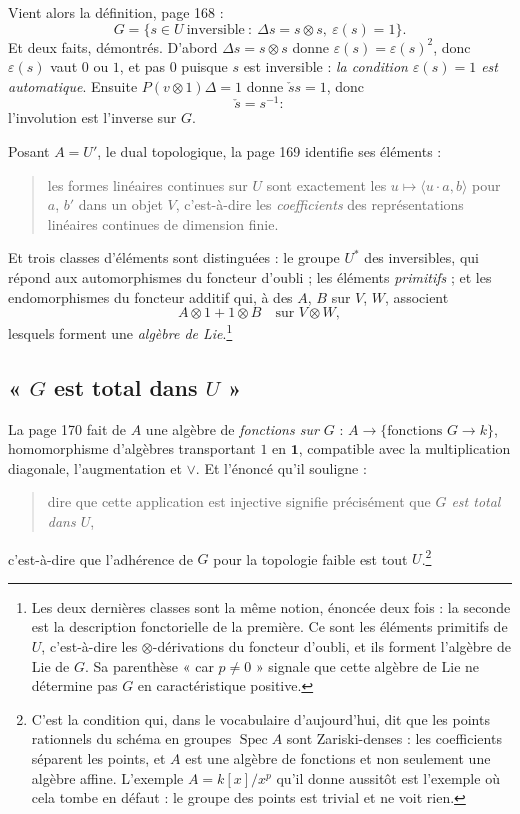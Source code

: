 \documentclass[11pt,a4paper]{article}
\begin{document}
Vient alors la définition, page 168 :
\[
G = \bigl\{ s \in U \ \text{inversible} \ :\ \Delta s = s \otimes s ,\
\varepsilon(s) = 1 \bigr\} .
\]
Et deux faits, démontrés. D'abord $\Delta s = s \otimes s$ donne
$\varepsilon(s) = \varepsilon(s)^{2}$, donc $\varepsilon(s)$ vaut $0$ ou $1$,
et pas $0$ puisque $s$ est inversible : \emph{la condition $\varepsilon(s) = 1$
est automatique}. Ensuite $P(v \otimes 1)\Delta = 1$ donne $\check{s}s = 1$,
donc
\[
\check{s} = s^{-1} :
\]
l'involution est l'inverse sur $G$.

Posant $A = U'$, le dual topologique, la page 169 identifie ses éléments :
\begin{quote}
les formes linéaires continues sur $U$ sont exactement les $u \mapsto
\langle u \cdot a, b \rangle$ pour $a$, $b'$ dans un objet $V$, c'est-à-dire
les \emph{coefficients} des représentations linéaires continues de dimension
finie.
\end{quote}
Et trois classes d'éléments sont distinguées : le groupe $U^{*}$ des
inversibles, qui répond aux automorphismes du foncteur d'oubli ; les éléments
\emph{primitifs} ; et les endomorphismes du foncteur additif qui, à des
$A$, $B$ sur $V$, $W$, associent
\[
A \otimes 1 + 1 \otimes B \quad\text{sur } V \otimes W ,
\]
lesquels forment une \emph{algèbre de Lie}.\footnote{Les deux dernières classes
sont la même notion, énoncée deux fois : la seconde est la description
fonctorielle de la première. Ce sont les éléments primitifs de $U$,
c'est-à-dire les $\otimes$-dérivations du foncteur d'oubli, et ils forment
l'algèbre de Lie de $G$. Sa parenthèse « car $p \neq 0$ » signale que cette
algèbre de Lie ne détermine pas $G$ en caractéristique positive.}

\subsection*{« $G$ est total dans $U$ »}

La page 170 fait de $A$ une algèbre de \emph{fonctions sur $G$} : $A \to
\{\text{fonctions } G \to k\}$, homomorphisme d'algèbres transportant $1$ en
$\mathbf{1}$, compatible avec la multiplication diagonale, l'augmentation et
$\vee$. Et l'énoncé qu'il souligne :
\begin{quote}
dire que cette application est injective signifie précisément que \emph{$G$ est
total dans $U$},
\end{quote}
c'est-à-dire que l'adhérence de $G$ pour la topologie faible est tout
$U$.\footnote{C'est la condition qui, dans le vocabulaire d'aujourd'hui, dit
que les points rationnels du schéma en groupes $\operatorname{Spec}A$ sont
Zariski-denses : les coefficients séparent les points, et $A$ est une
algèbre de fonctions et non seulement une algèbre affine. L'exemple $A =
k[x]/x^{p}$ qu'il donne aussitôt est l'exemple où cela tombe en défaut : le
groupe des points est trivial et ne voit rien.}
\end{document}
